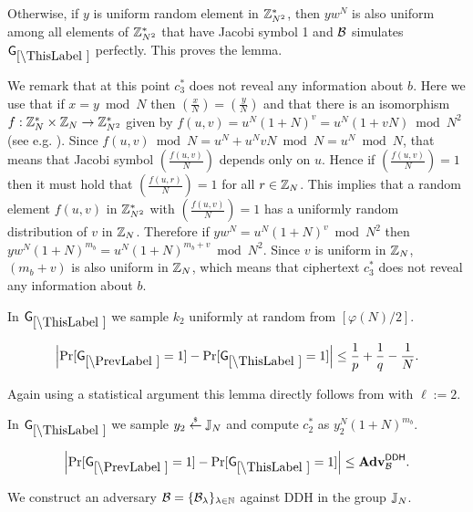 Otherwise, if $y$ is uniform random element in $\mathbb{Z}_{N^2}^*$, then $yw^N$ is also uniform among all elements of $\mathbb{Z}_{N^2}^*$ that have Jacobi symbol 1 and $\mathcal{B}$ simulates $\games_\thisgame$ perfectly. This proves the lemma.

We remark that at this point $c_3^*$ does not reveal any information about $b$. Here we use that if $x = y \bmod N$ then $\left( \frac{x}{N} \right)= \left( \frac{y}{N} \right)$ and that there is an isomorphism $f:\mathbb{Z}_N^* \times \mathbb{Z}_N \rightarrow\mathbb{Z}_{N^2}^*$ given by $f(u,v)=u^N(1+N)^v = u^N(1+vN) \bmod N^2$ (see e.g. \cite[Proposition 13.6]{books/crc/KatzLindell2014}).  Since $f(u,v) \bmod N = u^N + u^NvN \bmod N = u^N \bmod N$, that means that Jacobi symbol $\left( \frac{f(u,v)}{N} \right)$ depends only on $u$. Hence if $\left( \frac{f(u,v)}{N} \right) = 1$ then it must hold that $\left( \frac{f(u,r)}{N} \right) = 1$ for all $r \in \mathbb{Z}_N$. This implies that a random element $f(u,v)$ in $\mathbb{Z}_{N^2}^*$ with $\left( \frac{f(u,v)}{N} \right) = 1$ has a uniformly random distribution of $v$ in $\mathbb{Z}_N$. Therefore if $yw^N = u^N(1+N)^v \bmod N^2$ then  $yw^N(1+N)^{m_b}  = u^N(1+N)^{m_b+v} \bmod N^2$. Since $v$ is uniform in $\mathbb{Z}_N$, $(m_b + v)$ is also uniform in $\mathbb{Z}_N$, which means that ciphertext $c_3^*$ does not reveal any information about $b$. 

In $\games_\thisgame$ we sample $k_2$ uniformly at random from $[\varphi(N)/2]$. 

\begin{lemma}
\[
\left|\Pr[\games_\prevgame = 1] - \Pr[\games_\thisgame = 1]\right| \leq \frac{1}{p}+\frac{1}{q}-\frac{1}{N}.
\]
\end{lemma}

Again using a statistical argument this lemma directly follows from  with $\ell:=2$.

In $\games_\thisgame$ we sample $y_2 \stackrel{{\scriptscriptstyle\$}}{\leftarrow} \mathbb{J}_N$ and compute $c_2^*$ as  $y_2^N(1+N)^{m_b}$. 

\begin{lemma}\label{lem:ddh-rom-lh}
\[
\left|\Pr[\games_\prevgame = 1] - \Pr[\games_\thisgame = 1]\right| \leq \advtg_\advB^\ddh.
\]
\end{lemma}
We construct an adversary $\mathcal{B} = \{\mathcal{B}_{\lambda}\}_{\lambda \in \mathbb{N}}$ against DDH in the group $\mathbb{J}_N$. %

